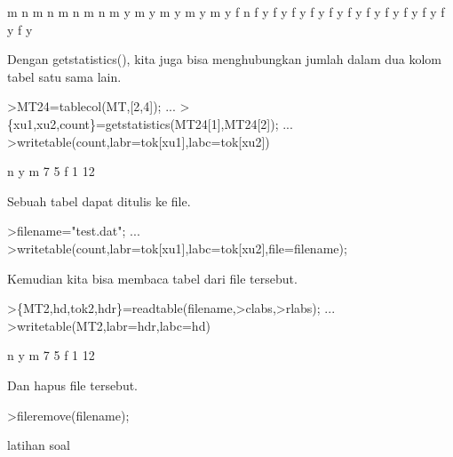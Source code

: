 \documentclass[a4paper,10pt]{article}
\begin{document}
\begin{eulernotebook}
\begin{eulercomment}
\begin{eulercomment}
\begin{euleroutput}
           m         n
           m         n
           m         n
           m         n
           m         y
           m         y
           m         y
           m         y
           m         y
           f         n
           f         y
           f         y
           f         y
           f         y
           f         y
           f         y
           f         y
           f         y
           f         y
           f         y
           f         y
           f         y
\end{euleroutput}
\begin{eulercomment}
Dengan getstatistics(), kita juga bisa menghubungkan jumlah dalam dua
kolom tabel satu sama lain.
\end{eulercomment}
\begin{eulerprompt}
>MT24=tablecol(MT,[2,4]); ...
>\{xu1,xu2,count\}=getstatistics(MT24[1],MT24[2]); ...
>writetable(count,labr=tok[xu1],labc=tok[xu2])
\end{eulerprompt}
\begin{euleroutput}
                     n         y
           m         7         5
           f         1        12
\end{euleroutput}
\begin{eulercomment}
Sebuah tabel dapat ditulis ke file.
\end{eulercomment}
\begin{eulerprompt}
>filename="test.dat"; ...
>writetable(count,labr=tok[xu1],labc=tok[xu2],file=filename);
\end{eulerprompt}
\begin{eulercomment}
Kemudian kita bisa membaca tabel dari file tersebut.
\end{eulercomment}
\begin{eulerprompt}
>\{MT2,hd,tok2,hdr\}=readtable(filename,>clabs,>rlabs); ...
>writetable(MT2,labr=hdr,labc=hd)
\end{eulerprompt}
\begin{euleroutput}
                     n         y
           m         7         5
           f         1        12
\end{euleroutput}
\begin{eulercomment}
Dan hapus file tersebut.
\end{eulercomment}
\begin{eulerprompt}
>fileremove(filename);
\end{eulerprompt}
\eulersubheading{}
\begin{eulercomment}
latihan soal
\end{eulercomment}

\end{eulercomment}
\end{eulercomment}
\end{eulernotebook}
\end{document}
